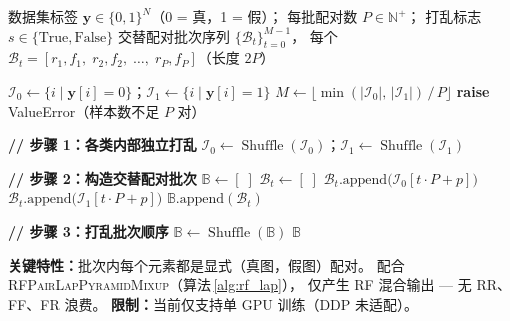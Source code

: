 \documentclass[12pt]{article}
\begin{document}
\clearpage
\begin{algorithm}[p]
\caption{BalancePairSampler（v2）：显式（真图，假图）配对构造}
\label{alg:balance_v2}
\begin{algorithmic}[1]
\Require
  数据集标签 $\mathbf{y} \in \{0,1\}^{N}$（0 = 真，1 = 假）；
  每批配对数 $P \in \mathbb{N}^+$；
  打乱标志 $s \in \{\text{True}, \text{False}\}$
\Ensure
  交替配对批次序列 $\{\mathcal{B}_t\}_{t=0}^{M-1}$，
  每个 $\mathcal{B}_t = [r_1, f_1,\; r_2, f_2,\; \dots,\; r_P, f_P]$（长度 $2P$）

\State $\mathcal{I}_0 \gets \{i \mid \mathbf{y}[i] = 0\}$；\quad $\mathcal{I}_1 \gets \{i \mid \mathbf{y}[i] = 1\}$
\State $M \gets \big\lfloor \min(|\mathcal{I}_0|,\, |\mathcal{I}_1|) \,/\, P \big\rfloor$
  \State \textbf{raise} ValueError（样本数不足 $P$ 对）
\EndIf

\State \textbf{// 步骤 1：各类内部独立打乱}
  \State $\mathcal{I}_0 \gets \operatorname{Shuffle}(\mathcal{I}_0)$；\quad $\mathcal{I}_1 \gets \operatorname{Shuffle}(\mathcal{I}_1)$
\EndIf

\State \textbf{// 步骤 2：构造交替配对批次}
\State $\mathbb{B} \gets [\;]$
  \State $\mathcal{B}_t \gets [\;]$
    \State $\mathcal{B}_t.\text{append}\big(\mathcal{I}_0[t \cdot P + p]\big)$ 
    \State $\mathcal{B}_t.\text{append}\big(\mathcal{I}_1[t \cdot P + p]\big)$ 
  \EndFor
  \State $\mathbb{B}.\text{append}(\mathcal{B}_t)$
\EndFor

\State \textbf{// 步骤 3：打乱批次顺序}
  \State $\mathbb{B} \gets \operatorname{Shuffle}(\mathbb{B})$
\EndIf
\State \Return $\mathbb{B}$

\vspace{4pt}
\State \textbf{关键特性：}批次内每个元素都是显式（真图，假图）配对。
\State 配合 \textsc{RFPairLapPyramidMixup}（算法\,\ref{alg:rf_lap}），
\State 仅产生 RF 混合输出 — 无 RR、FF、FR 浪费。
\State \textbf{限制：}当前仅支持单 GPU 训练（DDP 未适配）。
\end{algorithmic}
\end{algorithm}
\end{document}
